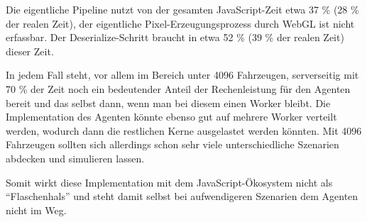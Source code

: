 Die eigentliche Pipeline nutzt von der gesamten JavaScript-Zeit etwa 37 \% (28 \% der realen Zeit), der eigentliche Pixel-Erzeugungsprozess durch WebGL ist nicht erfassbar.
Der Deserialize-Schritt braucht in etwa 52 \% (39 \% der realen Zeit) dieser Zeit.

In jedem Fall steht, vor allem im Bereich unter 4096 Fahrzeugen, serverseitig mit 70 \% der Zeit noch ein bedeutender Anteil der Rechenleistung für den Agenten bereit und das selbst dann, wenn man bei diesem einen Worker bleibt.
Die Implementation des Agenten könnte ebenso gut auf mehrere Worker verteilt werden, wodurch dann die restlichen Kerne ausgelastet werden könnten.
Mit 4096 Fahrzeugen sollten sich allerdings schon sehr viele unterschiedliche Szenarien abdecken und simulieren lassen.

Somit wirkt diese Implementation mit dem JavaScript-Ökosystem nicht als \enquote{Flaschenhals} und steht damit selbst bei aufwendigeren Szenarien dem Agenten nicht im Weg.
